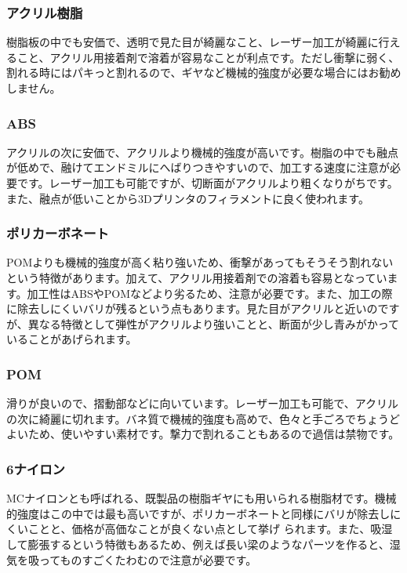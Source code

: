 \documentclass[b5paper, 9pt, twocolumn, titlepage,openany]{jsbook}%
\begin{document}
\subsubsection{アクリル樹脂}

樹脂板の中でも安価で、透明で見た目が綺麗なこと、レーザー加工が綺麗に行えること、アクリル用接着剤で溶着が容易なことが利点です。ただし衝撃に弱く、割れる時にはパキっと割れるので、ギヤなど機械的強度が必要な場合にはお勧めしません。\\
\subsubsection{ABS}

アクリルの次に安価で、アクリルより機械的強度が高いです。樹脂の中でも融点が低めで、融けてエンドミルにへばりつきやすいので、加工する速度に注意が必要です。レーザー加工も可能ですが、切断面がアクリルより粗くなりがちです。また、融点が低いことから3Dプリンタのフィラメントに良く使われます。\\
\subsubsection{ポリカーボネート}

POMよりも機械的強度が高く粘り強いため、衝撃があってもそうそう割れないという特徴があります。加えて、アクリル用接着剤での溶着も容易となっています。加工性はABSやPOMなどより劣るため、注意が必要です。また、加工の際に除去しにくいバリが残るという点もあります。見た目がアクリルと近いのですが、異なる特徴として弾性がアクリルより強いことと、断面が少し青みがかっていることがあげられます。\\
\subsubsection{POM}

滑りが良いので、摺動部などに向いています。レーザー加工も可能で、アクリルの次に綺麗に切れます。バネ質で機械的強度も高めで、色々と手ごろでちょうどよいため、使いやすい素材です。撃力で割れることもあるので過信は禁物です。\\
\subsubsection{6ナイロン}

MCナイロンとも呼ばれる、既製品の樹脂ギヤにも用いられる樹脂材です。機械的強度はこの中では最も高いですが、ポリカーボネートと同様にバリが除去しにくいことと、価格が高価なことが良くない点として挙げ られます。また、吸湿して膨張するという特徴もあるため、例えば長い梁のようなパーツを作ると、湿気を吸ってものすごくたわむので注意が必要です。\\
\end{document}
